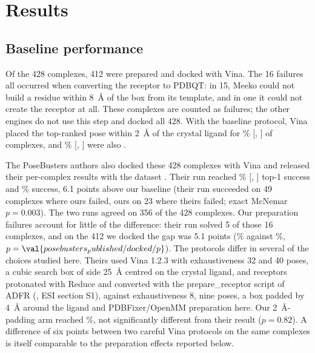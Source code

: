 \section{Results}
\label{sec:results}


\subsection{Baseline performance}

Of the 428 complexes, 412 were prepared and docked with Vina. The 16 failures all occurred
when converting the receptor to PDBQT: in 15, Meeko could not build a residue within
\SI{8}{\angstrom} of the box from its template, and in one it could not create the receptor
at all. These
complexes are counted as failures; the other engines do not use this step and docked all
428. With the baseline protocol, Vina placed the top-ranked pose within \SI{2}{\angstrom} of
the crystal ligand for \% [, ] of complexes, and \% [, ] were also
\pbvalid{}.

The PoseBusters authors also docked these 428 complexes with Vina and released their
per-complex results with the dataset \citep{posebusters2023data}. Their run reached \%
[, ] top-1 success and \% \pbvalid{} success, 6.1 points above our baseline
(their run succeeded on 49 complexes where ours failed, ours on 23 where theirs failed;
exact McNemar $p = 0.003$). The two runs agreed on 356 of the 428 complexes. Our
preparation failures account for little of the difference: their run solved 5 of those 16
complexes, and on the 412 we docked the gap was 5.1 points (\% against \%,
$p = \val{posebusters_published/docked/p}$). The protocols differ in several of the choices studied here. Theirs used Vina
1.2.3 with exhaustiveness 32 and 40 poses, a cubic search box of side \SI{25}{\angstrom}
centred on the crystal ligand, and receptors protonated with Reduce \citep{word1999reduce}
and converted with the prepare\_receptor script of ADFR \citep{ravindranath2015autodockfr}
(\citealp{buttenschoen2024posebusters}, ESI section S1), against exhaustiveness 8, nine
poses, a box
padded by \SI{4}{\angstrom} around the ligand and PDBFixer/OpenMM preparation here. Our
\SI{2}{\angstrom}-padding arm reached \%, not significantly different from their result
($p = 0.82$). A difference of six points between two careful Vina protocols on the same
complexes is itself comparable to the preparation effects reported below.

